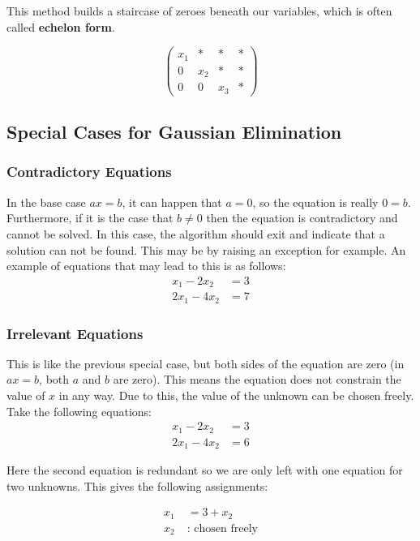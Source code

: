 \documentclass{article}
\begin{document}
	This method builds a staircase of zeroes beneath our variables, which is often called \textbf{echelon form}.
	
	\[ \left(
	\begin{array}{ccc|c}
			x_{1} & * & * & * \\
			0 & x_{2} & * & * \\
			0 & 0 & x_{3} & *
		\end{array}
		\right) \]
	
	\subsection{Special Cases for Gaussian Elimination}
	\subsubsection{Contradictory Equations}
	In the base case $ax = b$, it can happen that $a = 0$, so the equation is really $0 = b$. Furthermore, if it is the case that $b \neq 0$ then the equation is contradictory and cannot be solved. In this case, the algorithm should exit and indicate that a solution can not be found. This may be by raising an exception for example. An example of equations that may lead to this is as follows:
	\begin{align*}
		x_{1} - 2x_{2} &= 3 \\
		2x_{1} - 4x_{2} &= 7
	\end{align*}
	
	\subsubsection{Irrelevant Equations}
	This is like the previous special case, but both sides of the equation are zero (in $ax = b$, both $a$ and $b$ are zero). This means the equation does not constrain the value of $x$ in any way. Due to this, the value of the unknown can be chosen freely. Take the following equations:
	\begin{align*}
		x_{1} - 2x_{2} &= 3 \\
		2x_{1} - 4x_{2} &= 6
	\end{align*}
	
	Here the second equation is redundant so we are only left with one equation for two unknowns. This gives the following assignments:
	
	\begin{align*}
		x_{1} \; &= 3 + x_{2} \\
		x_{2} \; &: \text{ chosen freely}
	\end{align*}
	
\end{document}
